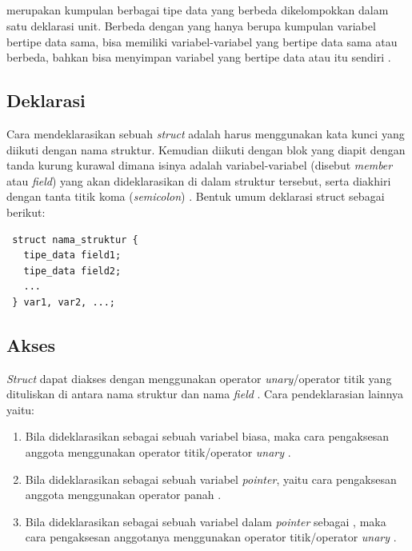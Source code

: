 \documentclass[../main.tex]{subfiles}
\begin{document}
    \vspace{-0.5ex}
    \subsection{{\Struct}}
    \vspace{-0.5ex}
    {\Struct} merupakan kumpulan berbagai tipe data yang berbeda dikelompokkan dalam satu deklarasi unit. Berbeda dengan {\sarray} yang hanya berupa kumpulan variabel bertipe data sama, {\struct} bisa memiliki variabel-variabel yang bertipe data sama atau berbeda, bahkan bisa menyimpan variabel yang bertipe data {\sarray} atau {\struct}  itu sendiri \parencite{Bachtiar_2005}.

    \subsection{Deklarasi {\Struct}}
    \vspace{-0.5ex}
    Cara mendeklarasikan sebuah \textit{struct} adalah harus menggunakan kata kunci  yang diikuti dengan nama struktur. Kemudian diikuti dengan blok yang diapit dengan tanda kurung kurawal  dimana isinya adalah variabel-variabel (disebut \textit{member} atau \textit{field}) yang akan dideklarasikan di dalam struktur tersebut, serta diakhiri dengan tanta titik koma (\textit{semicolon}) \parencite{utami10}. Bentuk umum deklarasi struct sebagai berikut:

    \vspace{-0.25ex}
\begin{lstlisting}
 struct nama_struktur {
   tipe_data field1;
   tipe_data field2;
   ...
 } var1, var2, ...;
\end{lstlisting}

    \vspace{-0.25ex}
    \subsection{Akses {\Struct}}
    \vspace{-0.25ex}
    \textit{Struct} dapat diakses dengan menggunakan operator \textit{unary}/operator titik  yang dituliskan di antara nama struktur dan nama \textit{field} \parencite{utami10}. Cara pendeklarasian lainnya yaitu:
    
    \begin{enumerate}
        \item Bila {\struct} dideklarasikan sebagai sebuah variabel biasa, maka cara pengaksesan anggota {\struct} menggunakan operator titik/operator \textit{unary} .
        \item Bila {\struct} dideklarasikan sebagai sebuah variabel \textit{pointer}, yaitu cara pengaksesan anggota {\struct} menggunakan operator panah .
        \item Bila {\struct} dideklarasikan sebagai sebuah variabel dalam \textit{pointer} sebagai {\sarray}, maka cara pengaksesan anggotanya {\struct} menggunakan operator titik/operator \textit{unary} .
    \end{enumerate}
\end{document}
